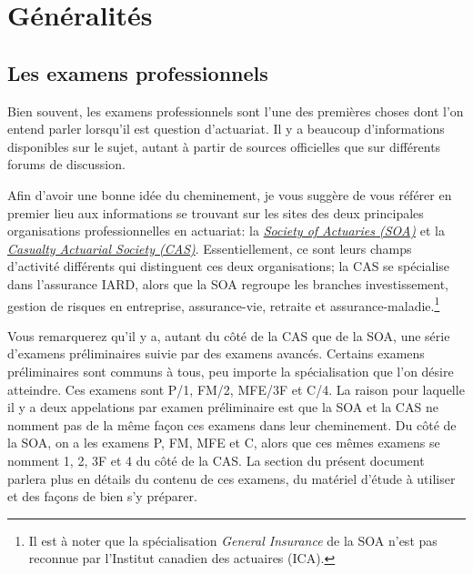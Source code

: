 \section*{Généralités}
\label{sec:generalites}

\subsection*{Les examens professionnels}
\label{subsec:examsprofs}
\captionsetup{justification=centering}
Bien souvent, les examens professionnels sont l'une des premières choses dont l'on entend parler lorsqu'il est question d'actuariat. Il y a beaucoup d'informations disponibles sur le sujet, autant à partir de sources officielles que sur différents forums de discussion.\vspace{\baselineskip}

Afin d'avoir une bonne idée du cheminement, je vous suggère de vous référer en premier lieu aux informations se trouvant sur les sites des deux principales organisations professionnelles en actuariat: la \href{https://soa.org/member/}{\emph{Society of Actuaries (SOA)}} et la \href{http://www.casact.org/}{\emph{Casualty Actuarial Society (CAS)}}. Essentiellement, ce sont leurs champs d'activité différents qui distinguent ces deux organisations; la CAS se spécialise dans l'assurance IARD, alors que la SOA regroupe les branches investissement, gestion de risques en entreprise, assurance-vie, retraite et assurance-maladie.\footnote{ Il est à noter que la spécialisation \emph{General Insurance} de la SOA n'est pas reconnue par l'Institut canadien des actuaires (ICA).}\vspace{\baselineskip}

Vous remarquerez qu'il y a, autant du côté de la CAS que de la SOA, une série d'examens préliminaires suivie par des examens avancés. Certains examens préliminaires sont communs à tous, peu importe la spécialisation que l'on désire atteindre. Ces examens sont P/1, FM/2, MFE/3F et C/4. La raison pour laquelle il y a deux appelations par examen préliminaire est que la SOA et la CAS ne nomment pas de la même façon ces examens dans leur cheminement. Du côté de la SOA, on a les examens P, FM, MFE et C, alors que ces mêmes examens se nomment 1, 2, 3F et 4 du côté de la CAS. La section  du présent document parlera plus en détails du contenu de ces examens, du matériel d'étude à utiliser et des façons de bien s'y préparer.\vspace{\baselineskip}

